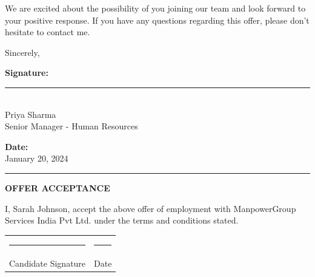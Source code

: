 \documentclass[a4paper,8pt]{article}
\begin{document}
\vspace{0.4cm}

We are excited about the possibility of you joining our team and look forward to your positive response. If you have any questions regarding this offer, please don't hesitate to contact me.

\vspace{0.4cm}

Sincerely,


\vspace{2cm}
\begin{minipage}[t]{0.45\textwidth}
    \raggedright
    \textbf{Signature:} \\[0.5cm]
    
    \rule{5cm}{0.5pt} \\[0.3cm]
    
    Priya Sharma \\
    
    Senior Manager - Human Resources \\
    
\end{minipage}
\hfill
\begin{minipage}[t]{0.45\textwidth}
    \raggedleft
    \textbf{Date:} \\[0.5cm]
    
    January 20, 2024
    
\end{minipage} 

\vspace{0.4cm}

\hrule
\vspace{0.4cm}

\textbf{OFFER ACCEPTANCE}

I, Sarah Johnson, accept the above offer of employment with ManpowerGroup Services India Pvt Ltd. under the terms and conditions stated.

\vspace{1.2cm}

\begin{tabular}{ll}
\rule{6cm}{0.5pt} & \rule{3cm}{0.5pt} \\
Candidate Signature & Date \\
\end{tabular}
\end{document}
